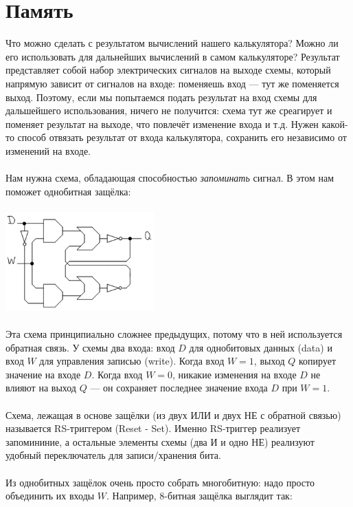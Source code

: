 \documentclass[11pt]{book}
\begin{document}
\section{Память}
Что можно сделать с результатом вычислений нашего калькулятора?
Можно ли его использовать для дальнейших вычислений в самом калькуляторе?
Результат представляет собой набор электрических сигналов на выходе схемы,
который напрямую зависит от сигналов на входе: поменяешь вход --- тут же поменяется выход.
Поэтому, если мы попытаемся подать результат на вход схемы для дальшейшего использования,
ничего не получится: схема тут же среагирует и поменяет результат на выходе, что повлечёт изменение входа и т.д.
Нужен какой-то способ отвязать результат от входа калькулятора, сохранить его независимо от изменений на входе.
\\ \\
Нам нужна схема, обладающая способностью \emph{запоминать} сигнал.
В этом нам поможет однобитная защёлка:
\\ \\
\includegraphics[height=1.5in]{pic/latch.png}
\\ \\
Эта схема принципиально сложнее предыдущих, потому что в ней используется обратная связь.
У схемы два входа: вход $D$ для однобитовых данных (data) и вход $W$ для управления записью (write).
Когда вход $W=1$, выход $Q$ копирует значение на входе $D$.
Когда вход $W=0$, никакие изменения на входе $D$ не влияют на выход $Q$ --- он сохраняет последнее значение входа $D$ при $W=1$.
\\ \\
Схема, лежащая в основе защёлки (из двух ИЛИ и двух НЕ с обратной связью) называется RS-триггером (Reset - Set).
Именно RS-триггер реализует запомининие, а остальные элементы схемы (два И и одно НЕ) реализуют удобный переключатель для записи/хранения бита.
\\ \\
Из однобитных защёлок очень просто собрать многобитную: надо просто объединить их входы $W$.
Например, 8-битная защёлка выглядит так:
\\ \\
\end{document}
